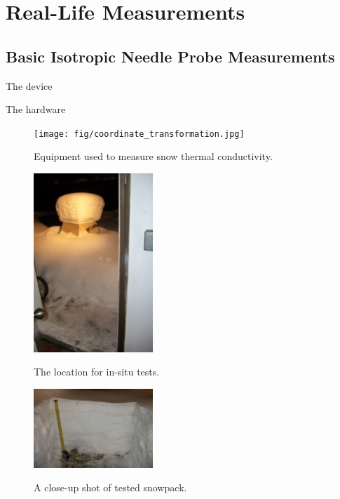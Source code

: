 \chapter{Real-Life Measurements}

\section{Basic Isotropic Needle Probe Measurements}

The device

The hardware

\begin{figure}[h]
\centering
\texttt{[image: fig/coordinate\_transformation.jpg]}
\label{fig:equipment}
\caption{Equipment used to measure snow thermal conductivity.}
\end{figure}

\begin{figure}[h]
\centering
\includegraphics[width=0.4\textwidth]{fig/insitu_location.jpg}
\label{fig:insitu_location}
\caption{The location for in-situ tests.}
\end{figure}

\begin{figure}[h]
\centering
\includegraphics[width=0.4\textwidth]{fig/snowpack.jpg}
\label{fig:snowpack}
\caption{A close-up shot of tested snowpack.}
\end{figure}

